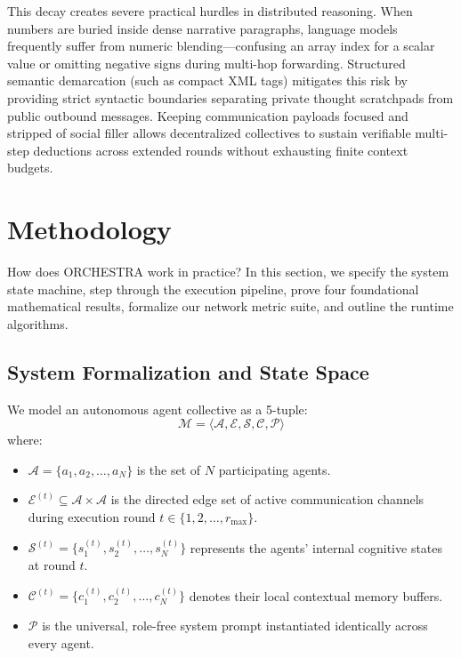 \documentclass{ieeeaccess}
\begin{document}
This decay creates severe practical hurdles in distributed reasoning. When numbers are buried inside dense narrative paragraphs, language models frequently suffer from numeric blending---confusing an array index for a scalar value or omitting negative signs during multi-hop forwarding. Structured semantic demarcation (such as compact XML tags) mitigates this risk by providing strict syntactic boundaries separating private thought scratchpads from public outbound messages. Keeping communication payloads focused and stripped of social filler allows decentralized collectives to sustain verifiable multi-step deductions across extended rounds without exhausting finite context budgets.


\section{Methodology}
\label{sec:methodology}

How does ORCHESTRA work in practice? In this section, we specify the system state machine, step through the execution pipeline, prove four foundational mathematical results, formalize our network metric suite, and outline the runtime algorithms.

\subsection{System Formalization and State Space}
We model an autonomous agent collective as a 5-tuple:
\begin{equation}
\label{eq:mas_tuple}
\mathcal{M} = \langle \mathcal{A}, \mathcal{E}, \mathcal{S}, \mathcal{C}, \mathcal{P} \rangle
\end{equation}
where:
\begin{itemize}
    \item $\mathcal{A} = \{a_1, a_2, \dots, a_N\}$ is the set of $N$ participating agents.
    \item $\mathcal{E}^{(t)} \subseteq \mathcal{A} \times \mathcal{A}$ is the directed edge set of active communication channels during execution round $t \in \{1, 2, \dots, r_{\max}\}$.
    \item $\mathcal{S}^{(t)} = \{s_1^{(t)}, s_2^{(t)}, \dots, s_N^{(t)}\}$ represents the agents' internal cognitive states at round $t$.
    \item $\mathcal{C}^{(t)} = \{c_1^{(t)}, c_2^{(t)}, \dots, c_N^{(t)}\}$ denotes their local contextual memory buffers.
    \item $\mathcal{P}$ is the universal, role-free system prompt instantiated identically across every agent.
\end{itemize}
\end{document}
